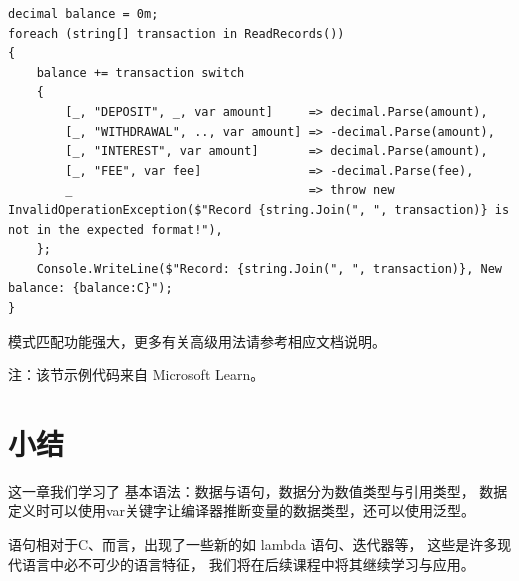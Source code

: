 \begin{lstlisting}
decimal balance = 0m;
foreach (string[] transaction in ReadRecords())
{
    balance += transaction switch
    {
        [_, "DEPOSIT", _, var amount]     => decimal.Parse(amount),
        [_, "WITHDRAWAL", .., var amount] => -decimal.Parse(amount),
        [_, "INTEREST", var amount]       => decimal.Parse(amount),
        [_, "FEE", var fee]               => -decimal.Parse(fee),
        _                                 => throw new InvalidOperationException($"Record {string.Join(", ", transaction)} is not in the expected format!"),
    };
    Console.WriteLine($"Record: {string.Join(", ", transaction)}, New balance: {balance:C}");
}
\end{lstlisting}

\cs 模式匹配功能强大，更多有关高级用法请参考相应文档说明。

注：该节示例代码来自 Microsoft Learn。


\section{小结}
这一章我们学习了 \cs 基本语法：数据与语句，数据分为数值类型与引用类型，
数据定义时可以使用var关键字让编译器推断变量的数据类型，还可以使用泛型。

\cs 语句相对于C、\cpp 而言，出现了一些新的如 lambda 语句、迭代器等，
这些是许多现代语言中必不可少的语言特征，
我们将在后续课程中将其继续学习与应用。

